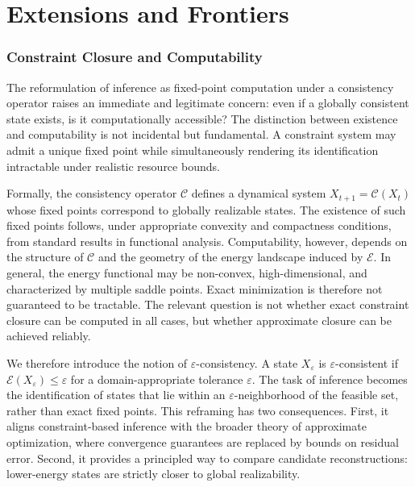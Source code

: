 \documentclass[11pt, oneside]{article}
\begin{document}
\part{Extensions and Frontiers}

\section{Constraint Closure and Computability}

The reformulation of inference as fixed-point computation under a consistency operator raises an immediate and legitimate concern: even if a globally consistent state exists, is it computationally accessible? The distinction between existence and computability is not incidental but fundamental. A constraint system may admit a unique fixed point while simultaneously rendering its identification intractable under realistic resource bounds.

Formally, the consistency operator $\mathcal{C}$ defines a dynamical system $X_{t+1} = \mathcal{C}(X_t)$ whose fixed points correspond to globally realizable states. The existence of such fixed points follows, under appropriate convexity and compactness conditions, from standard results in functional analysis. Computability, however, depends on the structure of $\mathcal{C}$ and the geometry of the energy landscape induced by $\mathcal{E}$. In general, the energy functional may be non-convex, high-dimensional, and characterized by multiple saddle points. Exact minimization is therefore not guaranteed to be tractable. The relevant question is not whether exact constraint closure can be computed in all cases, but whether approximate closure can be achieved reliably.

We therefore introduce the notion of $\varepsilon$-consistency. A state $X_\varepsilon$ is $\varepsilon$-consistent if $\mathcal{E}(X_\varepsilon) \leq \varepsilon$ for a domain-appropriate tolerance $\varepsilon$. The task of inference becomes the identification of states that lie within an $\varepsilon$-neighborhood of the feasible set, rather than exact fixed points. This reframing has two consequences. First, it aligns constraint-based inference with the broader theory of approximate optimization, where convergence guarantees are replaced by bounds on residual error. Second, it provides a principled way to compare candidate reconstructions: lower-energy states are strictly closer to global realizability.
\end{document}
